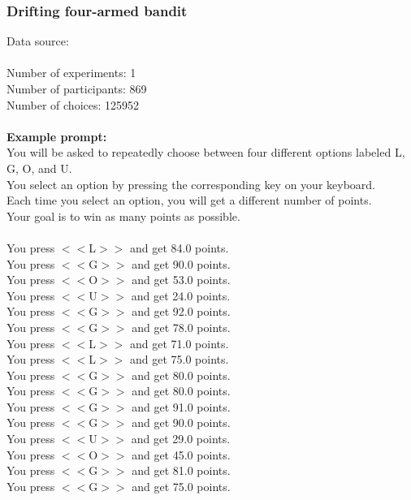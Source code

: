 \documentclass[pdflatex,sn-nature]{sn-jnl}%
\theoremstyle{thmstyleone}%
\theoremstyle{thmstyletwo}%
\theoremstyle{thmstylethree}%
\begin{document}
\subsubsection*{Drifting four-armed bandit}
Data source: \cite{Bahrami_Navajas_2022} \\ $~$ \\
Number of experiments: 1 $~$\\ 
Number of participants: 869 $~$\\ 
Number of choices: 125952 $~$\\ 
 $~$\\ 
\textbf{Example prompt:}
 $~$\\ 
You will be asked to repeatedly choose between four different options labeled L, G, O, and U. $~$\\ 
You select an option by pressing the corresponding key on your keyboard. $~$\\ 
Each time you select an option, you will get a different number of points. $~$\\ 
Your goal is to win as many points as possible. $~$\\ 
 $~$\\ 
You press $<<$L$>>$ and get 84.0 points. $~$\\ 
You press $<<$G$>>$ and get 90.0 points. $~$\\ 
You press $<<$O$>>$ and get 53.0 points. $~$\\ 
You press $<<$U$>>$ and get 24.0 points. $~$\\ 
You press $<<$G$>>$ and get 92.0 points. $~$\\ 
You press $<<$G$>>$ and get 78.0 points. $~$\\ 
You press $<<$L$>>$ and get 71.0 points. $~$\\ 
You press $<<$L$>>$ and get 75.0 points. $~$\\ 
You press $<<$G$>>$ and get 80.0 points. $~$\\ 
You press $<<$G$>>$ and get 80.0 points. $~$\\ 
You press $<<$G$>>$ and get 91.0 points. $~$\\ 
You press $<<$G$>>$ and get 90.0 points. $~$\\ 
You press $<<$U$>>$ and get 29.0 points. $~$\\ 
You press $<<$O$>>$ and get 45.0 points. $~$\\ 
You press $<<$G$>>$ and get 81.0 points. $~$\\ 
You press $<<$G$>>$ and get 75.0 points. $~$\\ 
\end{document}
